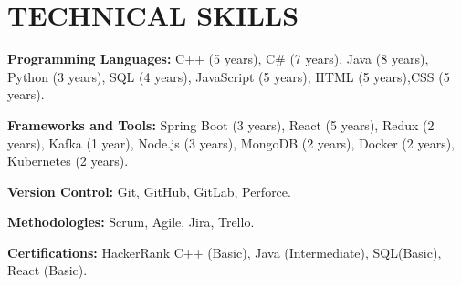 \documentclass[letterpaper,11pt]{article}
\begin{document}
\section{\color{airforceblue}TECHNICAL SKILLS}
 \begin{itemize}[leftmargin=.25in, label={}]
    \small{\item{
     \textbf{\normalsize{Programming Languages:}}{ \normalsize{ C++ (5 years), C\# (7 years), Java (8 years), Python (3 years), SQL (4 years), JavaScript (5 years), HTML (5 years),CSS (5 years).}} \\
      \vspace{1.2pt}
      
     \textbf{\normalsize{Frameworks and Tools:}}{ \normalsize{Spring Boot (3 years), React (5 years), Redux (2 years), Kafka (1 year), Node.js (3 years), MongoDB (2 years), Docker (2 years), Kubernetes (2 years).}} \\
      \vspace{1.2pt}

      \textbf{\normalsize{Version Control:}}{ \normalsize{Git, GitHub, GitLab, Perforce.}} \\
      \vspace{1.2pt}

      \textbf{\normalsize{Methodologies:}}{ \normalsize{Scrum, Agile, Jira, Trello.}} \\
      \vspace{1.2pt}
      
     \textbf{\normalsize{Certifications:}}{ \normalsize{HackerRank C++ (Basic), Java (Intermediate), SQL(Basic), React (Basic).}}

     }}
 \end{itemize}
 \vspace{-20pt}
 
\end{document}

